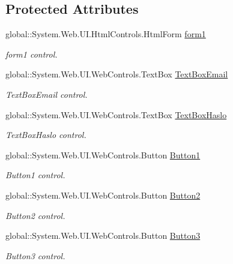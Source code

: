 \subsection*{Protected Attributes}
\begin{DoxyCompactItemize}
\item 
global\+::\+System.\+Web.\+U\+I.\+Html\+Controls.\+Html\+Form \hyperlink{class_dziennik_ocen_web2_1_1_web_form1_a38e3f99a2267a717e7772882a702c62c}{form1}
\begin{DoxyCompactList}\small\item\em form1 control. \end{DoxyCompactList}\item 
global\+::\+System.\+Web.\+U\+I.\+Web\+Controls.\+Text\+Box \hyperlink{class_dziennik_ocen_web2_1_1_web_form1_afd5c6cbba56f97163e3a77eacbe9f0c5}{Text\+Box\+Email}
\begin{DoxyCompactList}\small\item\em Text\+Box\+Email control. \end{DoxyCompactList}\item 
global\+::\+System.\+Web.\+U\+I.\+Web\+Controls.\+Text\+Box \hyperlink{class_dziennik_ocen_web2_1_1_web_form1_a243a5ae21436ccb946bb3e2e9bc4ae42}{Text\+Box\+Haslo}
\begin{DoxyCompactList}\small\item\em Text\+Box\+Haslo control. \end{DoxyCompactList}\item 
global\+::\+System.\+Web.\+U\+I.\+Web\+Controls.\+Button \hyperlink{class_dziennik_ocen_web2_1_1_web_form1_a14acc2b65cea9aecb77bb7d56ba12af6}{Button1}
\begin{DoxyCompactList}\small\item\em Button1 control. \end{DoxyCompactList}\item 
global\+::\+System.\+Web.\+U\+I.\+Web\+Controls.\+Button \hyperlink{class_dziennik_ocen_web2_1_1_web_form1_ae9c1f486a6ca18c24b98d8068c6a1414}{Button2}
\begin{DoxyCompactList}\small\item\em Button2 control. \end{DoxyCompactList}\item 
global\+::\+System.\+Web.\+U\+I.\+Web\+Controls.\+Button \hyperlink{class_dziennik_ocen_web2_1_1_web_form1_ad982d188e8e6201092bbafd8b038e81b}{Button3}
\begin{DoxyCompactList}\small\item\em Button3 control. \end{DoxyCompactList}\item 

\end{DoxyCompactItemize}
